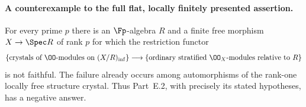 \paragraph{A counterexample to the full flat, locally finitely presented assertion.}

\begin{theorem}\label{thm:DE-E2-counterexample}
For every prime $p$ there is an $\Fp$-algebra $R$ and a finite free morphism $X\to\Spec R$ of rank $p$ for which the restriction functor
\[
 \{\text{crystals of $\OO$-modules on $(X/R)_{\rm inf}$}\}
 \longrightarrow
 \{\text{ordinary stratified $\OO_X$-modules relative to $R$}\}
\]
is not faithful.  The failure already occurs among automorphisms of the rank-one locally free structure crystal.  Thus Part~E.2, with precisely its stated hypotheses, has a negative answer.
\end{theorem}
